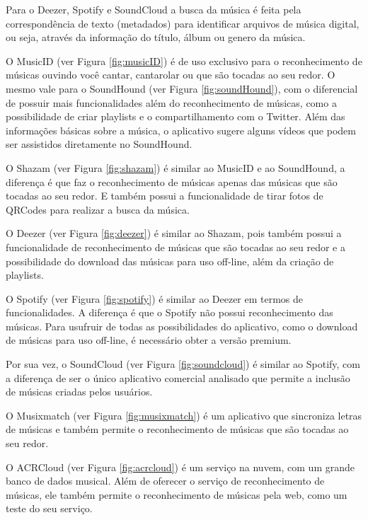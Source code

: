 Para o Deezer, Spotify e SoundCloud a busca da música é feita pela correspondência de texto (metadados) para identificar arquivos de música digital, ou seja, através da informação do título, álbum ou genero da música.

O MusicID (ver Figura \ref{fig:musicID}) é de uso exclusivo para o reconhecimento de músicas ouvindo você cantar, cantarolar ou que são tocadas ao seu redor. O mesmo vale para o SoundHound (ver Figura \ref{fig:soundHound}), com o diferencial de possuir mais funcionalidades além do reconhecimento de músicas, como a possibilidade de criar playlists e o compartilhamento com o Twitter. Além das informações básicas sobre a música, o aplicativo sugere alguns vídeos que podem ser assistidos diretamente no SoundHound.

O Shazam (ver Figura \ref{fig:shazam}) é similar ao MusicID e ao SoundHound, a diferença é que faz o reconhecimento de músicas apenas das músicas que são tocadas ao seu redor. E também possui a funcionalidade de tirar fotos de QRCodes para realizar a busca da música.


O Deezer (ver Figura \ref{fig:deezer}) é similar ao Shazam, pois também possui a funcionalidade de reconhecimento de músicas que são tocadas ao seu redor e a possibilidade do download das músicas para uso off-line, além da criação de playlists.

O Spotify (ver Figura \ref{fig:spotify}) é similar ao Deezer em termos de funcionalidades. A diferença é que o Spotify não possui reconhecimento das músicas. Para usufruir de todas as possibilidades do aplicativo, como o download de músicas para uso off-line, é necessário obter a versão premium.

Por sua vez, o SoundCloud (ver Figura \ref{fig:soundcloud}) é similar ao Spotify, com a diferença de ser o único aplicativo comercial analisado que permite a inclusão de músicas criadas pelos usuários.

O Musixmatch (ver Figura \ref{fig:musixmatch}) é um aplicativo que sincroniza letras de músicas e também permite o reconhecimento de músicas que são tocadas ao seu redor.

O ACRCloud (ver Figura \ref{fig:acrcloud}) é um serviço na nuvem, com um grande banco de dados musical. Além de oferecer o serviço de reconhecimento de músicas, ele também permite o reconhecimento de músicas pela web, como um teste do seu serviço.

